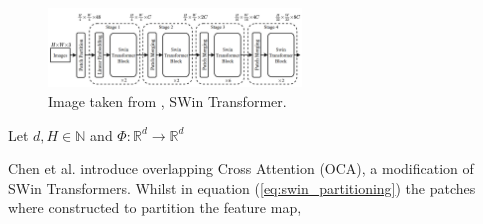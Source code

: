 \begin{figure}[h!]
    \begin{center}
        \includegraphics[width=0.6\textwidth]{models/preliminaries/imgs/swin.png}
    \end{center}
    \caption{Image taken from \cite{liuSwinTransformerHierarchical2021}, SWin Transformer.}
    \label{fig:swin}
\end{figure}

\begin{definition}
    Let $d, H \in \mathbb N$ and $\Phi: \mathbb R^d \to \mathbb R^{d}$
\end{definition}

Chen et al. \cite{chenHATHybridAttention2024} introduce overlapping Cross Attention (OCA),
a modification of SWin Transformers.
Whilst in equation (\ref{eq:swin_partitioning}) the patches where constructed to partition the feature map,


